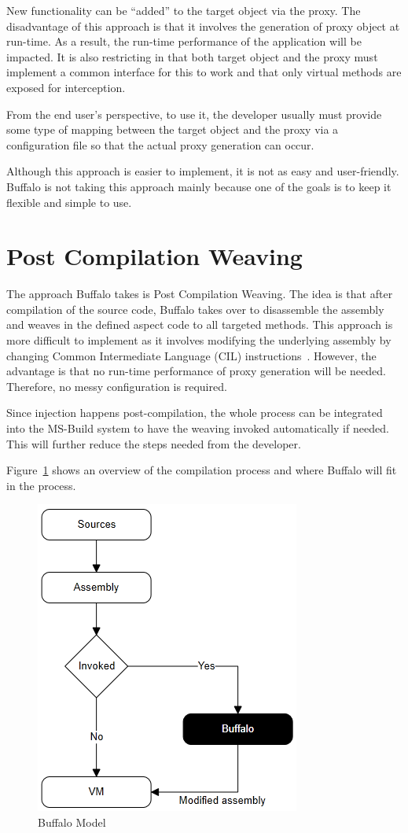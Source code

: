 New functionality can be “added” to the target object via the proxy. The disadvantage of this approach is that it involves the generation of proxy object at run-time. As a result, the run-time performance of the application will be impacted. It is also restricting in that both target object and the proxy must implement a common interface for this to work and that only virtual methods are exposed for interception.

From the end user's perspective, to use it, the developer usually must provide some type of mapping between the target object and the proxy via a configuration file so that the actual proxy generation can occur. 

Although this approach is easier to implement, it is not as easy and user-friendly. Buffalo is not taking this approach mainly because one of the goals is to keep it flexible and simple to use.

\section{Post Compilation Weaving}

The approach Buffalo takes is Post Compilation Weaving. The idea is that after compilation of the source code, Buffalo takes over to disassemble the assembly and weaves in the defined aspect code to all targeted methods. This approach is more difficult to implement as it involves modifying the underlying assembly by changing Common Intermediate Language (CIL) instructions~\cite{rewrite_msil}. However, the advantage is that no run-time performance of proxy generation will be needed. Therefore, no messy configuration is required.

Since injection happens post-compilation, the whole process can be integrated into the MS-Build system to have the weaving invoked automatically if needed. This will further reduce the steps needed from the developer.

Figure~\ref{buffalo_model} shows an overview of the compilation process and where Buffalo will fit in the process.

\begin{figure}[H]
  \includegraphics[scale=1.0]{BuffaloOverview2.PNG}
  \centering
  \caption{Buffalo Model\label{buffalo_model}}
\end{figure}

